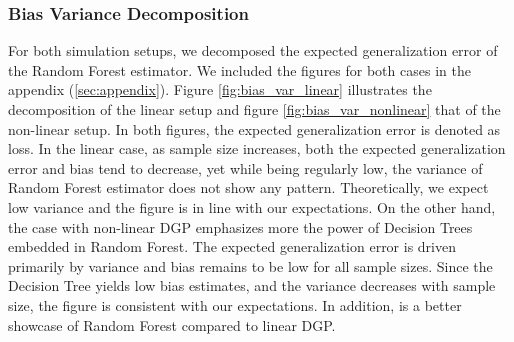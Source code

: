 \subsubsection{Bias Variance Decomposition}
For both simulation setups, we decomposed the 
expected generalization error of the
Random Forest estimator. We included the figures for both 
cases in the appendix (\ref{sec:appendix}). 
Figure \ref{fig:bias_var_linear} illustrates the decomposition of the
linear setup and 
figure \ref{fig:bias_var_nonlinear} that of the non-linear setup. 
In both figures, the expected generalization error 
is denoted as loss. 
In the linear case, as sample size increases, both 
the expected generalization error and bias tend to decrease, 
yet while being regularly low, the variance of 
Random Forest estimator does not show any pattern. 
Theoretically, we expect low variance and 
the figure is in line with our expectations.
On the other hand, the case with non-linear DGP emphasizes 
more the power of Decision Trees embedded in Random Forest. 
The expected generalization error is driven primarily 
by variance and bias remains to be low for all sample sizes. 
Since the Decision Tree yields low bias estimates, and 
the variance decreases with sample size, the
figure is consistent with our expectations.
In addition, is a better showcase of Random Forest compared to linear DGP.